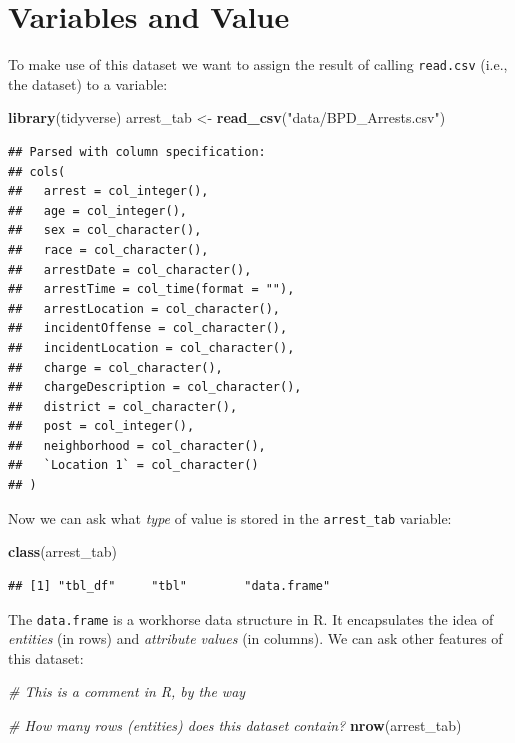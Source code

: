 \documentclass[12pt,]{book}
\newenvironment{Shaded}{\begin{snugshade}}{\end{snugshade}}
\newcommand{\KeywordTok}[1]{\textcolor[rgb]{0.13,0.29,0.53}{\textbf{#1}}}
\newcommand{\StringTok}[1]{\textcolor[rgb]{0.31,0.60,0.02}{#1}}
\newcommand{\CommentTok}[1]{\textcolor[rgb]{0.56,0.35,0.01}{\textit{#1}}}
\newcommand{\NormalTok}[1]{#1}
\theoremstyle{definition}
\theoremstyle{definition}
\theoremstyle{remark}
\begin{document}
\section{Variables and Value}\label{variables-and-value}

To make use of this dataset we want to assign the result of calling
\texttt{read.csv} (i.e., the dataset) to a variable:

\begin{Shaded}
\begin{Highlighting}[]
\KeywordTok{library}\NormalTok{(tidyverse)}
\NormalTok{arrest_tab <-}\StringTok{ }\KeywordTok{read_csv}\NormalTok{(}\StringTok{"data/BPD_Arrests.csv"}\NormalTok{)}
\end{Highlighting}
\end{Shaded}

\begin{verbatim}
## Parsed with column specification:
## cols(
##   arrest = col_integer(),
##   age = col_integer(),
##   sex = col_character(),
##   race = col_character(),
##   arrestDate = col_character(),
##   arrestTime = col_time(format = ""),
##   arrestLocation = col_character(),
##   incidentOffense = col_character(),
##   incidentLocation = col_character(),
##   charge = col_character(),
##   chargeDescription = col_character(),
##   district = col_character(),
##   post = col_integer(),
##   neighborhood = col_character(),
##   `Location 1` = col_character()
## )
\end{verbatim}

Now we can ask what \emph{type} of value is stored in the
\texttt{arrest\_tab} variable:

\begin{Shaded}
\begin{Highlighting}[]
\KeywordTok{class}\NormalTok{(arrest_tab)}
\end{Highlighting}
\end{Shaded}

\begin{verbatim}
## [1] "tbl_df"     "tbl"        "data.frame"
\end{verbatim}

The \texttt{data.frame} is a workhorse data structure in R. It
encapsulates the idea of \emph{entities} (in rows) and \emph{attribute
values} (in columns). We can ask other features of this dataset:

\begin{Shaded}
\begin{Highlighting}[]
\CommentTok{# This is a comment in R, by the way}

\CommentTok{# How many rows (entities) does this dataset contain?}
\KeywordTok{nrow}\NormalTok{(arrest_tab)}
\end{Highlighting}
\end{Shaded}
\end{document}
